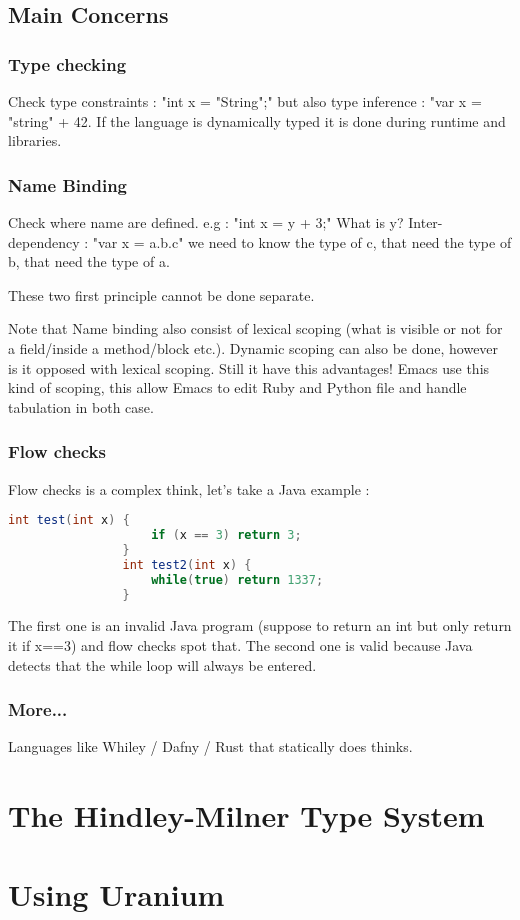     \subsection{Main Concerns}
        \subsubsection{Type checking}
            \theoremstyle{definition}
            \begin{definition}
                Check type constraints : "int x = "String";" but also type
                inference : "var x = "string" + 42.
                If the language is dynamically typed it is done during runtime and libraries.
            \end{definition}

        \subsubsection{Name Binding}
            \theoremstyle{definition}
            \begin{definition}
                Check where name are defined. e.g : "int x = y + 3;" What is y?
                Inter-dependency : "var x = a.b.c" we need to know the type of
                c, that need the type of b, that need the type of a.
            \end{definition}
            These two first principle cannot be done separate.

            Note that Name binding also consist of lexical scoping (what is
            visible or not for a field/inside a method/block etc.). Dynamic
            scoping can also be done, however is it opposed with lexical
            scoping. Still it have this advantages! Emacs use this kind of
            scoping, this allow Emacs to edit Ruby and Python file and handle
            tabulation in both case.
        \subsubsection{Flow checks}
            Flow checks is a complex think, let's take a Java example : 
            \begin{lstlisting}[language=Java]
                int test(int x) {
                    if (x == 3) return 3;
                }
                int test2(int x) {
                    while(true) return 1337;
                }
            \end{lstlisting}
            The first one is an invalid Java program (suppose to return an int
            but only return it if x==3) and flow checks spot that. The second
            one is valid because Java detects that the while loop will always be
            entered.
        \subsubsection{More...}
            Languages like Whiley / Dafny / Rust that statically does thinks.
\section{The Hindley-Milner Type System}

\section{Using Uranium}
